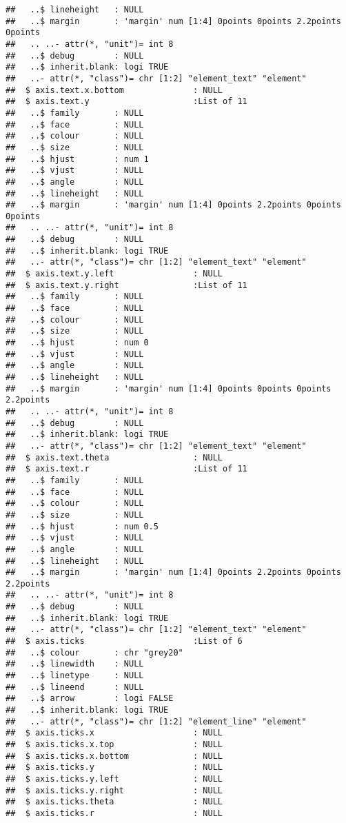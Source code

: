 \documentclass[
]{article}
\begin{document}
\begin{verbatim}
##   ..$ lineheight   : NULL
##   ..$ margin       : 'margin' num [1:4] 0points 0points 2.2points 0points
##   .. ..- attr(*, "unit")= int 8
##   ..$ debug        : NULL
##   ..$ inherit.blank: logi TRUE
##   ..- attr(*, "class")= chr [1:2] "element_text" "element"
##  $ axis.text.x.bottom              : NULL
##  $ axis.text.y                     :List of 11
##   ..$ family       : NULL
##   ..$ face         : NULL
##   ..$ colour       : NULL
##   ..$ size         : NULL
##   ..$ hjust        : num 1
##   ..$ vjust        : NULL
##   ..$ angle        : NULL
##   ..$ lineheight   : NULL
##   ..$ margin       : 'margin' num [1:4] 0points 2.2points 0points 0points
##   .. ..- attr(*, "unit")= int 8
##   ..$ debug        : NULL
##   ..$ inherit.blank: logi TRUE
##   ..- attr(*, "class")= chr [1:2] "element_text" "element"
##  $ axis.text.y.left                : NULL
##  $ axis.text.y.right               :List of 11
##   ..$ family       : NULL
##   ..$ face         : NULL
##   ..$ colour       : NULL
##   ..$ size         : NULL
##   ..$ hjust        : num 0
##   ..$ vjust        : NULL
##   ..$ angle        : NULL
##   ..$ lineheight   : NULL
##   ..$ margin       : 'margin' num [1:4] 0points 0points 0points 2.2points
##   .. ..- attr(*, "unit")= int 8
##   ..$ debug        : NULL
##   ..$ inherit.blank: logi TRUE
##   ..- attr(*, "class")= chr [1:2] "element_text" "element"
##  $ axis.text.theta                 : NULL
##  $ axis.text.r                     :List of 11
##   ..$ family       : NULL
##   ..$ face         : NULL
##   ..$ colour       : NULL
##   ..$ size         : NULL
##   ..$ hjust        : num 0.5
##   ..$ vjust        : NULL
##   ..$ angle        : NULL
##   ..$ lineheight   : NULL
##   ..$ margin       : 'margin' num [1:4] 0points 2.2points 0points 2.2points
##   .. ..- attr(*, "unit")= int 8
##   ..$ debug        : NULL
##   ..$ inherit.blank: logi TRUE
##   ..- attr(*, "class")= chr [1:2] "element_text" "element"
##  $ axis.ticks                      :List of 6
##   ..$ colour       : chr "grey20"
##   ..$ linewidth    : NULL
##   ..$ linetype     : NULL
##   ..$ lineend      : NULL
##   ..$ arrow        : logi FALSE
##   ..$ inherit.blank: logi TRUE
##   ..- attr(*, "class")= chr [1:2] "element_line" "element"
##  $ axis.ticks.x                    : NULL
##  $ axis.ticks.x.top                : NULL
##  $ axis.ticks.x.bottom             : NULL
##  $ axis.ticks.y                    : NULL
##  $ axis.ticks.y.left               : NULL
##  $ axis.ticks.y.right              : NULL
##  $ axis.ticks.theta                : NULL
##  $ axis.ticks.r                    : NULL

\end{verbatim}
\end{document}
